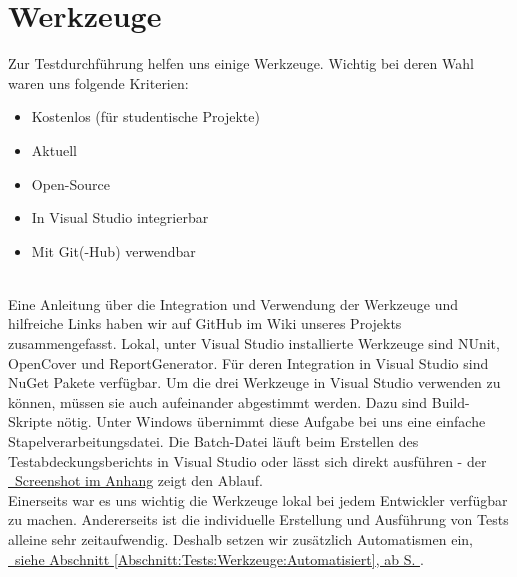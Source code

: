 %



\newpage



\section{Werkzeuge}
\label{Abschnitt:Tests:Werkzeuge}

Zur Testdurchführung helfen uns einige Werkzeuge. Wichtig bei deren Wahl waren uns folgende Kriterien:\\

\begin{itemize}

	\item Kostenlos (für studentische Projekte)
	\item Aktuell
	\item Open-Source
	\item In Visual Studio integrierbar
	\item Mit Git(-Hub) verwendbar

\end{itemize}

~\\

Eine Anleitung über die Integration und Verwendung der Werkzeuge und hilfreiche Links haben wir auf GitHub im Wiki unseres Projekts zusammengefasst. Lokal, unter Visual Studio installierte Werkzeuge sind NUnit, OpenCover und ReportGenerator. Für deren Integration in Visual Studio sind NuGet Pakete verfügbar. Um die drei Werkzeuge in Visual Studio verwenden zu können, müssen sie auch aufeinander abgestimmt werden. Dazu sind  Build-Skripte nötig. Unter Windows übernimmt diese Aufgabe bei uns eine einfache Stapelverarbeitungsdatei. Die \glqq Batch\grqq-Datei läuft beim Erstellen des Testabdeckungsberichts in Visual Studio oder lässt sich direkt ausführen - der \hyperref[Abb:Werkzeuge:Coverage_Build_Batch]{\mousecursor~Screenshot im Anhang} zeigt den Ablauf.\\

Einerseits war es uns wichtig die Werkzeuge lokal bei jedem Entwickler verfügbar zu machen. Andererseits ist die individuelle Erstellung und Ausführung von Tests alleine sehr zeitaufwendig. Deshalb setzen wir zusätzlich Automatismen ein, \hyperref[Abschnitt:Tests:Werkzeuge:Automatisiert]{\mousecursor~siehe Abschnitt \ref{Abschnitt:Tests:Werkzeuge:Automatisiert}, ab S. \pageref{Abschnitt:Tests:Werkzeuge:Automatisiert}}.
\\


